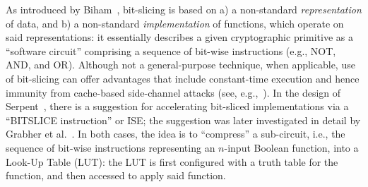 
\cite{SCARV:Gutmann:00}
\cite{SCARV:WuWeaAus:01}
\cite{SCARV:TheSisPne:09}
\cite{SCARV:MTRGS:99}
\cite{SCARV:BarGioMar:09}
\cite{SCARV:RegIen:16}
\cite{SCARV:FazLopOli:18}


\cite{SCARV:LeeShiYan:01,SCARV:LSYRR:04}


As introduced by Biham~\cite{SCARV:Biham:97}, bit-slicing is based on
a) a non-standard {\em representation} of data,
   and
b) a non-standard {\em implementation} of functions, which operate on
   said representations:
it essentially describes a given cryptographic primitive as a  ``software 
circuit'' comprising a sequence of bit-wise instructions (e.g., NOT, AND, 
and OR).  Although not a general-purpose technique, when applicable, use
of bit-slicing can offer advantages that include constant-time execution 
and hence immunity from cache-based side-channel attacks
(see, e.g.,~\cite{SCARV:KasSch:09}).
In the design of Serpent~\cite[Page 232]{SCARV:BihAndKnu:98}, there is a
suggestion for accelerating bit-sliced implementations via a ``BITSLICE 
instruction'' or ISE; the suggestion was later investigated in detail by 
Grabher et al.~\cite{SCARV:GraGroPag:08}.  In both cases, the idea is to 
``compress'' a sub-circuit, i.e., the sequence of bit-wise instructions 
representing an $n$-input Boolean function, into a Look-Up Table (LUT): 
the LUT is first configured with a truth table for the function, and then 
accessed to apply said function.  

